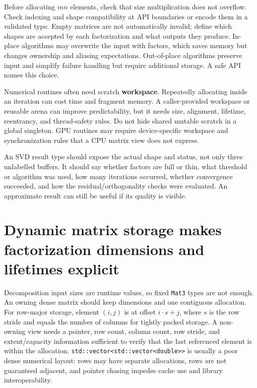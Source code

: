 Before allocating \(mn\) elements, check that size multiplication does not overflow. Check indexing and shape compatibility at API boundaries or encode them in a validated type. Empty matrices are not automatically invalid; define which shapes are accepted by each factorization and what outputs they produce. In-place algorithms may overwrite the input with factors, which saves memory but changes ownership and aliasing expectations. Out-of-place algorithms preserve input and simplify failure handling but require additional storage. A safe API names this choice.

Numerical routines often need scratch \textbf{workspace}. Repeatedly allocating inside an iteration can cost time and fragment memory. A caller-provided workspace or reusable arena can improve predictability, but it needs size, alignment, lifetime, reentrancy, and thread-safety rules. Do not hide shared mutable scratch in a global singleton. GPU routines may require device-specific workspace and synchronization rules that a CPU matrix view does not express.

An SVD result type should expose the actual shape and status, not only three unlabelled buffers. It should say whether factors are full or thin, what threshold or algorithm was used, how many iterations occurred, whether convergence succeeded, and how the residual/orthogonality checks were evaluated. An approximate result can still be useful if its quality is visible.

\section{Dynamic matrix storage makes factorization dimensions and lifetimes explicit}\label{02-foundations-ii-ch038-dynamic-matrix-storage-makes-factorization-dimensions-and-lifetimes-explicit}

Decomposition input sizes are runtime values, so fixed \texttt{Mat3} types are not enough. An owning dense matrix should keep dimensions and one contiguous allocation. For row-major storage, element \((i,j)\) is at offset \(i\cdot s+j\), where \(s\) is the row stride and equals the number of columns for tightly packed storage. A non-owning view needs a pointer, row count, column count, row stride, and extent/capacity information sufficient to verify that the last referenced element is within the allocation. \texttt{std::vector\textless{}std::vector\textless{}double\textgreater{}\textgreater{}} is usually a poor dense numerical layout: rows may have separate allocations, rows are not guaranteed adjacent, and pointer chasing impedes cache use and library interoperability.

